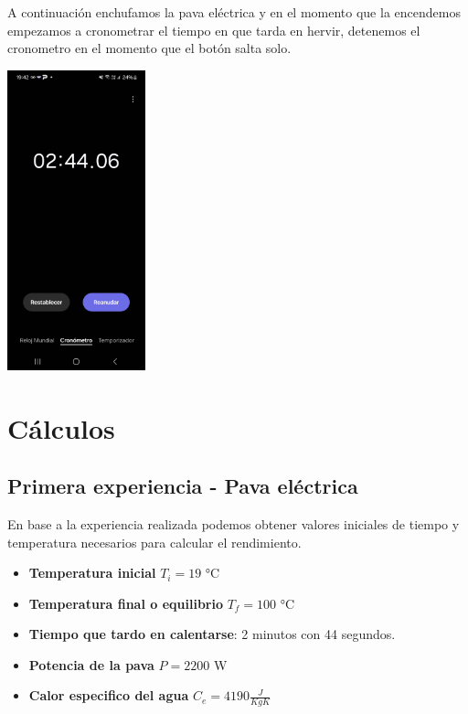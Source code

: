 \documentclass[]{article}
\begin{document}
\begin{center}
	A continuación enchufamos la pava eléctrica y en el momento que la encendemos empezamos a cronometrar el tiempo en que tarda en hervir, detenemos el cronometro en el momento que el botón salta solo.
\end{center}
\begin{center}
	\includegraphics[width=4cm]{pava6.jpg}
\end{center}

\section{Cálculos}
\subsection{Primera experiencia - Pava eléctrica}
\begin{flushleft}
	En base a la experiencia realizada podemos obtener valores iniciales de tiempo y temperatura necesarios para calcular el rendimiento.
\end{flushleft}

\begin{itemize}
	\item \textbf{Temperatura inicial} $T_{i} = 19$ °C
	\item \textbf{Temperatura final o equilibrio} $T_{f} = 100$ °C
	\item \textbf{Tiempo que tardo en calentarse}: 2 minutos con 44 segundos.
	\item \textbf{Potencia de la pava} $P = 2200$ W
	\item \textbf{Calor especifico del agua} $C_{e} = 4190 \frac{J}{KgK}$ 
\end{itemize}
\end{document}
